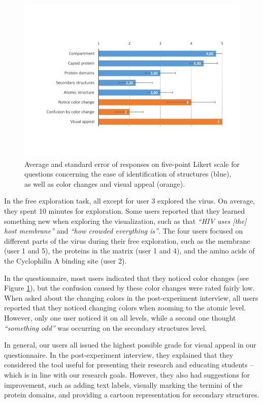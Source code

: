 \documentclass{egpubl}
\begin{document}
	 \begin{figure}
\centering
\includegraphics[width=1.0\linewidth]{Figures/questionnaires.pdf}
\caption{Average and standard error of responses on five-point Likert scale for questions concerning the ease of identification of structures (blue), as well as color changes and visual appeal (orange).}
\label{fig:questionnaire}
\end{figure}

In the free exploration task, all except for user 3 explored the virus. 
On average, they spent 10 minutes for exploration. 
Some users reported that they learned something new when exploring the visualization, such as that \textit{``HIV uses [the] host membrane''} and \textit{``how crowded everything is''}. 
The four users focused on different parts of the virus during their free exploration, such as the membrane (user 1 and 5), the proteins in the matrix (user 1 and 4), and the amino acids of the Cyclophilin A binding site (user 2). 

In the questionnaire, most users indicated that they noticed color changes (see Figure \ref{fig:questionnaire}), but the confusion caused by these color changes were rated fairly low. 
When asked about the changing colors in the post-experiment interview, all users reported that they noticed changing colors when zooming to the atomic level. 
However, only one user noticed it on all levels, while a second one thought \textit{``something odd''} was occurring on the secondary structures level. 

In general, our users all issued the highest possible grade for visual appeal in our questionnaire. 
In the post-experiment interview, they explained that they considered the tool useful for presenting their research and educating students -- which is in line with our research goals. 
However, they also had suggestions for improvement, such as adding text labels, visually marking the termini of the protein domains, and providing a cartoon representation for secondary structures. 
\end{document}

